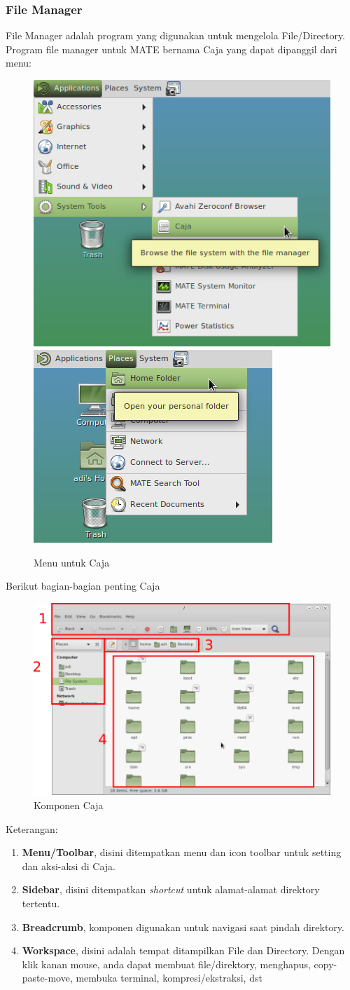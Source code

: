 \documentclass[12pt,]{article}
\begin{document}
	\subsubsection{File Manager}

	File Manager adalah program yang digunakan untuk mengelola File/Directory.
	Program file manager untuk MATE bernama Caja yang dapat dipanggil dari menu:
	\begin{figure}[H]
		\centering
		\includegraphics[width=0.4\linewidth]{images/mateapp/caja1}
		\includegraphics[width=0.4\linewidth]{images/mateapp/caja2}
		\caption{Menu untuk Caja}
	\end{figure}
	Berikut bagian-bagian penting Caja
	\begin{figure}[H]
		\centering
		\includegraphics[width=0.8\linewidth]{images/mateapp/caja3}
		\caption{Komponen Caja}
	\end{figure}
	Keterangan:
	\begin{enumerate}
		\item \textbf{Menu/Toolbar}, disini ditempatkan menu dan icon toolbar untuk setting dan aksi-aksi di Caja.
		\item \textbf{Sidebar}, disini ditempatkan \textit{shortcut} untuk alamat-alamat direktory tertentu.
		\item \textbf{Breadcrumb}, komponen digunakan untuk navigasi saat pindah direktory.
		\item \textbf{Workspace}, disini adalah tempat ditampilkan File dan Directory.
		Dengan klik kanan mouse, anda dapat membuat file/direktory, menghapus, copy-paste-move, membuka terminal, kompresi/ekstraksi, dst
	\end{enumerate}
\end{document}
